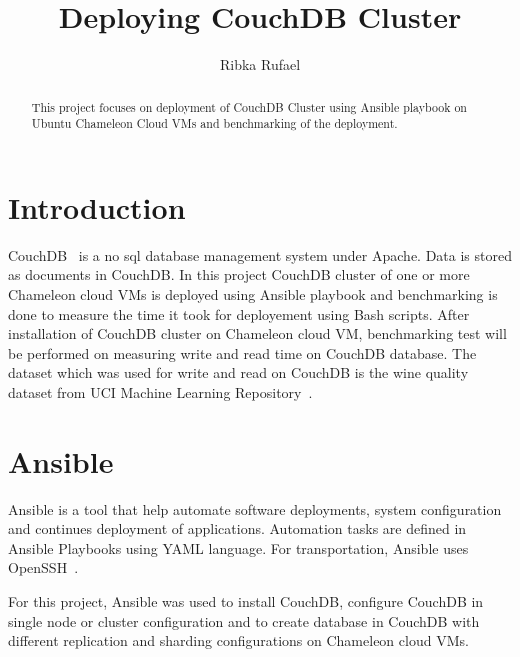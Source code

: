 \title{Deploying CouchDB Cluster}


\author{Ribka Rufael}
\orcid{}



\renewcommand{\shortauthors}{R. Rufael}


\begin{abstract}
  This project focuses on deployment of CouchDB Cluster using Ansible
  playbook on Ubuntu Chameleon Cloud VMs and benchmarking of the
  deployment.
\end{abstract}



\maketitle

\section{Introduction}

CouchDB~\cite{www-Couchdb} is a no sql database management system
under Apache. Data is stored as documents in CouchDB. In this project
CouchDB cluster of one or more Chameleon cloud VMs is deployed using
Ansible playbook and benchmarking is done to measure the time it took
for deployement using Bash scripts. After installation of CouchDB
cluster on Chameleon cloud VM, benchmarking test will be performed on
measuring write and read time on CouchDB database. The dataset which
was used for write and read on CouchDB is the wine quality dataset
from UCI Machine Learning Repository~\cite{www-WineQuality}.

\section{Ansible}
Ansible is a tool that help automate software deployments, system
configuration and continues deployment of applications. Automation
tasks are defined in Ansible Playbooks using YAML language. For
transportation, Ansible uses OpenSSH~\cite{www-Ansible}. 

For this project, Ansible was used to install CouchDB, configure
CouchDB in single node or cluster configuration and to create database
in CouchDB with different replication and sharding configurations on
Chameleon cloud VMs. 

